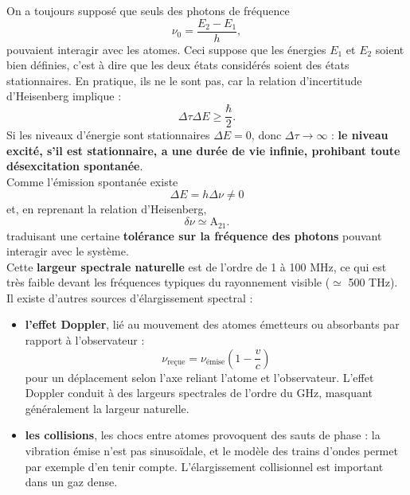 \documentclass[11pt,a4paper]{report}
\begin{document}
On a toujours supposé que seuls des photons de fréquence
\begin{equation}
	\nu_0 = \frac{E_2 - E_1}{h},
\end{equation}
pouvaient interagir avec les atomes. Ceci suppose que les énergies $E_1$ et $E_2$ soient bien définies, c'est à dire que les deux états considérés soient des états stationnaires. En pratique, ils ne le sont pas, car la relation d'incertitude d'Heisenberg implique :
\begin{equation}
	\Delta \tau \Delta E \geq \frac{\hbar}{2}.
\end{equation}
Si les niveaux d'énergie sont stationnaires $\Delta E = 0$, donc $\Delta \tau \rightarrow \infty$ : \textbf{le niveau excité, s'il est stationnaire, a une durée de vie infinie, prohibant toute désexcitation spontanée}.\\

Comme l'émission spontanée existe
\begin{equation}
	\boxed{\Delta E = h\Delta \nu \neq 0}
\end{equation}
et, en reprenant la relation d'Heisenberg,
\begin{equation}
	\boxed{\delta \nu \simeq \text{A}_{21}}.
\end{equation}
traduisant une certaine \textbf{tolérance sur la fréquence des photons} pouvant interagir avec le système.\\

Cette \textbf{largeur spectrale naturelle} est de l'ordre de 1 à 100 MHz, ce qui est très faible devant les fréquences typiques du rayonnement visible ($\simeq$ 500 THz).\\

Il existe d'autres sources d'élargissement spectral :
\begin{itemize}
	\item \textbf{l'effet Doppler}, lié au mouvement des atomes émetteurs ou absorbants par rapport à 			l'observateur :
		\begin{equation}
			\nu_\text{reçue} = \nu_\text{émise}\left(1 - \frac{v}{c} \right)
		\end{equation}
		pour un déplacement selon l'axe reliant l'atome et l'observateur. L'effet Doppler conduit à des 		largeurs spectrales de l'ordre du GHz, masquant généralement la largeur naturelle.
	\item \textbf{les collisions}, les chocs entre atomes provoquent des sauts de phase : la vibration 			émise n'est pas sinusoïdale, et le modèle des trains d'ondes permet par exemple d'en tenir 				compte. L'élargissement collisionnel est important dans un gaz dense.\\
\end{itemize}
\end{document}
